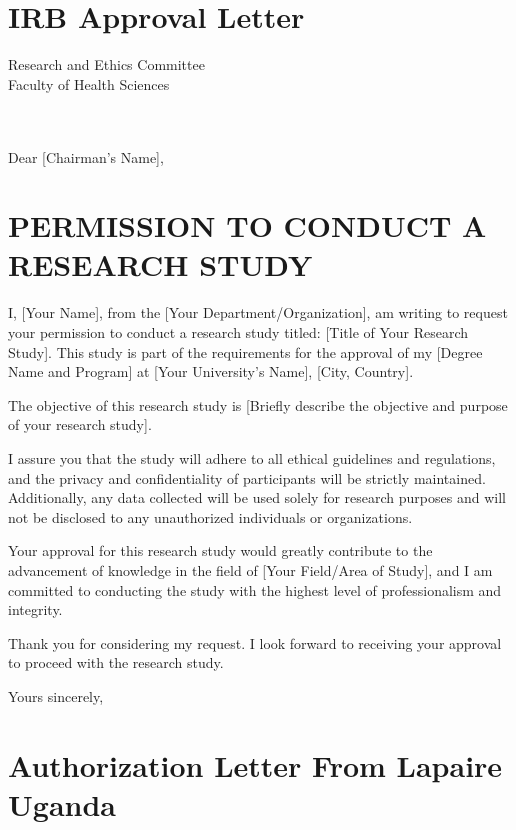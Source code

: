 \section{IRB Approval Letter}



\begin{letter}{Research and Ethics Committee \\
Faculty of Health Sciences \\
[Institution Name] \\
[Address] \\
[City, State, Zip Code]}

\date{\today}

\opening{Dear [Chairman's Name],}

\section*{PERMISSION TO CONDUCT A RESEARCH STUDY}

I, [Your Name], from the [Your Department/Organization], am writing to request your permission to conduct a research study titled: [Title of Your Research Study]. This study is part of the requirements for the approval of my [Degree Name and Program] at [Your University's Name], [City, Country].

The objective of this research study is [Briefly describe the objective and purpose of your research study].

I assure you that the study will adhere to all ethical guidelines and regulations, and the privacy and confidentiality of participants will be strictly maintained. Additionally, any data collected will be used solely for research purposes and will not be disclosed to any unauthorized individuals or organizations.

Your approval for this research study would greatly contribute to the advancement of knowledge in the field of [Your Field/Area of Study], and I am committed to conducting the study with the highest level of professionalism and integrity.

Thank you for considering my request. I look forward to receiving your approval to proceed with the research study.

\closing{Yours sincerely,}

\end{letter}




\section{Authorization Letter  From Lapaire Uganda}

